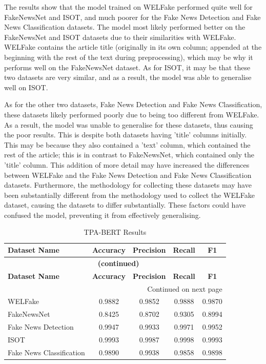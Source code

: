 \documentclass[
]{article}
\begin{document}
The results show that the model trained on WELFake performed quite well for FakeNewsNet and ISOT, and much poorer for the Fake News Detection and Fake News Classification datasets. The model most likely performed better on the FakeNewsNet and ISOT datasets due to their similarities with WELFake. WELFake contains the article title (originally in its own column; appended at the beginning with the rest of the text during preprocessing), which may be why it performs well on the FakeNewsNet dataset. As for ISOT, it may be that these two datasets are very similar, and as a result, the model was able to generalise well on ISOT. 

As for the other two datasets, Fake News Detection and Fake News Classification, these datasets likely performed poorly due to being too different from WELFake. As a result, the model was unable to generalise for these datasets, thus causing the poor results. This is despite both datasets having 'title' columns initially. This may be because they also contained a 'text' column, which contained the rest of the article; this is in contrast to FakeNewsNet, which contained only the 'title' column. This addition of more detail may have increased the differences between WELFake and the Fake News Detection and Fake News Classification datasets. Furthermore, the methodology for collecting these datasets may have been substantially different from the methodology used to collect the WELFake dataset, causing the datasets to differ substantially. These factors could have confused the model, preventing it from effectively generalising.

\begingroup
\setlength{\tabcolsep}{3pt}
\renewcommand{\arraystretch}{1.3}
\setlength\LTleft{0pt}
\setlength\LTright{0pt}
\begin{longtable}{@{} l c c c c @{}}
\caption{TPA-BERT Results} \label{tab:tpa_bert_results} \\
\toprule
\textbf{Dataset Name} & \textbf{Accuracy} & \textbf{Precision} & \textbf{Recall} & \textbf{F1} \\
\midrule
\endfirsthead

\multicolumn{5}{c}{{\bfseries \tablename\ \thetable{} (continued)}} \\
\toprule
\textbf{Dataset Name} & \textbf{Accuracy} & \textbf{Precision} & \textbf{Recall} & \textbf{F1} \\
\midrule
\endhead

\bottomrule
\multicolumn{5}{r}{{Continued on next page}} \\
\endfoot

\bottomrule
\endlastfoot
WELFake & 0.9882 & 0.9852 & 0.9888 & 0.9870 \\
FakeNewsNet & 0.8425 & 0.8702 & 0.9305 & 0.8994 \\
Fake News Detection & 0.9947 & 0.9933 & 0.9971 & 0.9952 \\
ISOT & 0.9993 & 0.9987 & 0.9998 & 0.9993 \\
Fake News Classification & 0.9890 & 0.9938 & 0.9858 & 0.9898 \\
\end{longtable}
\endgroup
\end{document}
